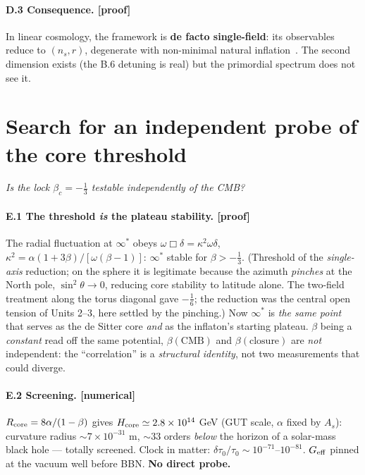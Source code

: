 \documentclass[11pt]{article}
\newcommand{\preuve}{{\small\textbf{[proof]}}}
\newcommand{\num}{{\small\textbf{[numerical]}}}
\theoremstyle{definition}
\begin{document}
\paragraph{D.3 Consequence. \preuve}
In linear cosmology, the framework is \textbf{de facto single-field}: its observables reduce to
$(n_s,r)$, degenerate with non-minimal natural inflation~\cite{FreeseFriemanOlinto1990,FerreiraNotariSimeon2018,Simeon2020}. The second dimension exists (the
B.6 detuning is real) but the primordial spectrum does not see it.

\section{Search for an independent probe of the core threshold}\label{ann:E}
\emph{Is the lock $\beta_c=-\tfrac13$ testable independently of the CMB?}

\paragraph{E.1 The threshold \emph{is} the plateau stability. \preuve}
The radial fluctuation at $\infty^\ast$ obeys $\omega\Box\delta=\kappa^2\omega\delta$,
$\kappa^2=\alpha(1+3\beta)/[\omega(\beta-1)]$: $\infty^\ast$ stable for $\beta>-\tfrac13$. (Threshold of
the \emph{single-axis} reduction; on the sphere it is legitimate because the azimuth \emph{pinches} at the
North pole, $\sin^2\!\theta\to0$, reducing core stability to latitude alone. The two-field treatment along
the torus diagonal gave $-\tfrac16$; the reduction was the central open tension of Units 2--3, here settled
by the pinching.) Now $\infty^\ast$ is \emph{the same point} that serves as the de Sitter core \emph{and}
as the inflaton's starting plateau. $\beta$ being a \emph{constant} read off the same potential,
$\beta(\text{CMB})$ and $\beta(\text{closure})$ are \emph{not} independent: the ``correlation'' is a
\emph{structural identity}, not two measurements that could diverge.

\paragraph{E.2 Screening. \num}
$R_{\rm core}=8\alpha/(1-\beta)$ gives $H_{\rm core}\simeq2.8\times10^{14}$ GeV (GUT scale, $\alpha$ fixed
by $A_s$): curvature radius $\sim7\times10^{-31}$ m, $\sim33$ orders \emph{below} the horizon of a
solar-mass black hole --- totally screened. Clock in matter: $\delta\tau_0/\tau_0\sim
10^{-71}$--$10^{-81}$. $G_{\rm eff}$ pinned at the vacuum well before BBN. \textbf{No direct probe.}
\end{document}
